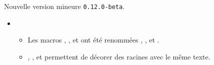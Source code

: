 Nouvelle version mineure \verb+0.12.0-beta+.

\begin{itemize}[itemsep=.5em]
    \item {}

    \begin{itemize}[itemsep=.5em]
        \item Les macros , ,  et  ont été renommées , ,  et .

		\item {}, ,  et  permettent de décorer des racines avec le même texte.
    \end{itemize}
\end{itemize}


\separation
